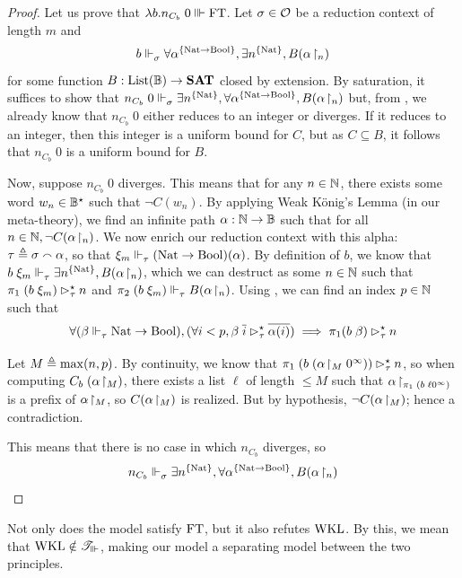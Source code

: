 \documentclass[a4paper,UKenglish,cleveref, autoref, thm-restate]{lipics-v2021}
\begin{document}
\begin{proof}
  Let us prove that $\lambda b. n_{C_b}\;0 \Vvdash\mathrm{FT}$. Let $\sigma\in\mathcal O$ be a reduction context of length $m$ and
  \[b \Vdash_{\sigma}^{} \forall \alpha^{\{\mathrm{Nat} \to \mathrm{Bool}\}}, \exists n^{\{\mathrm{Nat}\}}, B({\alpha}\!\upharpoonright_{n})\]
  for some function $B : \mathrm{List}(\mathbb B) \to {\mathbf{SAT}}$ closed by extension. By saturation, it suffices to show that
  $n_{C_b}\;0 \Vdash_{\sigma}^{} \exists n^{\{\mathrm{Nat}\}}, \forall \alpha^{\{\mathrm{Nat} \to \mathrm{Bool}\}}, B({\alpha}\!\upharpoonright_{n})$
  but, from , we already know that $n_{C_b}\;0$ either reduces to an integer or diverges. If it reduces to an integer, then this integer is a uniform bound for $C$, but as $C \subseteq B$, it follows that $n_{C_b}\;0$ is a uniform bound for $B$.

  Now, suppose $n_{C_b}\;0$ diverges. This means that for any $n \in \mathbb N$, there exists some word $w_n \in \mathbb B^\star$ such that $\lnot C(w_n)$. By applying Weak König's Lemma (in our meta-theory), we find an infinite path
  $\alpha : \mathbb N \to \mathbb B$
  such that for all $n \in \mathbb N, \lnot C({\alpha}\!\upharpoonright_{n})$. We now enrich our reduction context with this alpha:
  $\tau \triangleq \sigma \smallfrown \alpha$,
  so that $\xi_m \Vdash_{\tau}^{} (\mathrm{Nat} \to \mathrm{Bool})(\alpha)$. By definition of $b$, we know that
  $b\;\xi_m\Vdash_{\tau}^{} \exists n^{\{\mathrm{Nat}\}}, B({\alpha}\!\upharpoonright_{n})$,
  which we can destruct as some $n \in \mathbb N$ such that
  $\pi_1\;(b\;\xi_m) \rhd^{\star}_{\tau} n$ and $\pi_2\;(b\;\xi_m)\Vdash_{\tau}^{} B({\alpha}\!\upharpoonright_{n})$.
  Using , we can find an index $p\in \mathbb N$ such that
  \[\forall (\beta \Vdash_{\tau}^{} \mathrm{Nat} \to \mathrm{Bool}), (\forall i < p, \beta\;\overline i \rhd^{\star}_{\tau} \overline{\alpha(i)}) \implies \pi_1(b\;\beta) \rhd^{\star}_{\tau} n\]

  Let $M \triangleq \max(n,p)$.
  By continuity, we know that $\pi_1\;(b\;({\alpha}\!\upharpoonright_{M} 0^\infty)) \rhd^{\star}_{\tau}{} n$, so when computing $C_b\;({\alpha}\!\upharpoonright_{M})$, there exists a list $\ell$ of length $\leq M$ such that ${\alpha}\!\upharpoonright_{{\pi_1\;(b\;\ell 0^\infty)}}$ is a prefix of ${\alpha}\!\upharpoonright_{M}$, so $C({\alpha}\!\upharpoonright_{M})$ is realized. But by hypothesis, $\lnot C({\alpha}\!\upharpoonright_{M})$; hence a contradiction.

  This means that there is no case in which $n_{C_b}$ diverges, so
  \[n_{C_b}\Vdash_{\sigma}^{} \exists n^{\{\mathrm{Nat}\}}, \forall \alpha^{\{\mathrm{Nat} \to \mathrm{Bool}\}}, B({\alpha}\!\upharpoonright_{n})\qedhere\]
\end{proof}

Not only does the model satisfy $\mathrm{FT}$, but it also refutes $\mathrm{WKL}$. By this, we mean that $\mathrm{WKL}\notin\mathscr T_{\Vvdash}$, making our model a separating model between the two principles.
\end{document}
